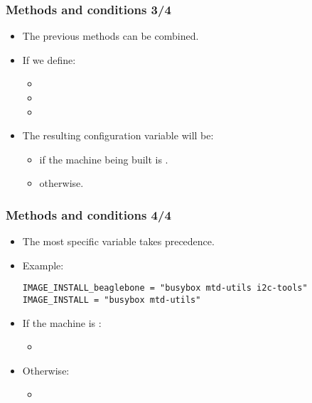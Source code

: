 \begin{frame}
  \frametitle{Methods and conditions 3/4}
  \begin{itemize}
    \item The previous methods can be combined.
    \item If we define:
      \begin{itemize}
        \item {}
        \item {}
        \item {}
      \end{itemize}
    \item The resulting configuration variable will be:
      \begin{itemize}
        \item {} if the machine being built is
          .
        \item {}
          otherwise.
      \end{itemize}
  \end{itemize}
\end{frame}

\begin{frame}[fragile]
  \frametitle{Methods and conditions 4/4}
  \begin{itemize}
    \item The most specific variable takes precedence.
    \item Example:
      \begin{verbatim}
IMAGE_INSTALL_beaglebone = "busybox mtd-utils i2c-tools"
IMAGE_INSTALL = "busybox mtd-utils"
      \end{verbatim}
    \item If the machine is :
      \begin{itemize}
        \item {}
      \end{itemize}
    \item Otherwise:
      \begin{itemize}
        \item {}
      \end{itemize}
  \end{itemize}
\end{frame}

